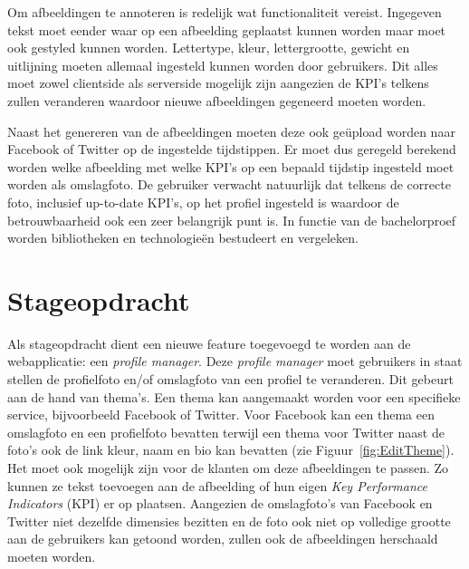 Om afbeeldingen te annoteren is redelijk wat functionaliteit vereist. Ingegeven tekst moet eender waar op een afbeelding geplaatst kunnen worden maar moet ook gestyled kunnen worden. Lettertype, kleur, lettergrootte, gewicht en uitlijning moeten allemaal ingesteld kunnen worden door gebruikers. Dit alles moet zowel clientside als serverside mogelijk zijn aangezien de KPI's telkens zullen veranderen waardoor nieuwe afbeeldingen gegeneerd moeten worden. 

Naast het genereren van de afbeeldingen moeten deze ook ge\"{u}pload worden naar Facebook of Twitter op de ingestelde tijdstippen. Er moet dus geregeld berekend worden welke afbeelding met welke KPI's op een bepaald tijdstip ingesteld moet worden als omslagfoto. De gebruiker verwacht natuurlijk dat telkens de correcte foto, inclusief up-to-date KPI's, op het profiel ingesteld is waardoor de betrouwbaarheid ook een zeer belangrijk punt is. In functie van de bachelorproef worden bibliotheken en technologie\"{e}n bestudeert en vergeleken.  





\iffalse
\chapter{Stageopdracht}
\vspace{-3cm}
Als stageopdracht dient een nieuwe feature toegevoegd te worden aan de webapplicatie: een \textit{profile manager}. Deze \textit{profile manager} moet gebruikers in staat stellen de profielfoto en/of omslagfoto van een profiel te veranderen. Dit gebeurt aan de hand van thema's. Een thema kan aangemaakt worden voor een specifieke service, bijvoorbeeld Facebook of Twitter. Voor Facebook kan een thema een omslagfoto en een profielfoto bevatten terwijl een thema voor Twitter naast de foto's ook de link kleur, naam en bio kan bevatten (zie Figuur~\ref{fig:EditTheme}). Het moet ook mogelijk zijn voor de klanten om deze afbeeldingen te passen. Zo kunnen ze tekst toevoegen aan de afbeelding of hun eigen \textit{Key Performance Indicators} (KPI) er op plaatsen. Aangezien de omslagfoto's van Facebook en Twitter niet dezelfde dimensies bezitten en de foto ook niet op volledige grootte aan de gebruikers kan getoond worden, zullen ook de afbeeldingen herschaald moeten worden.

